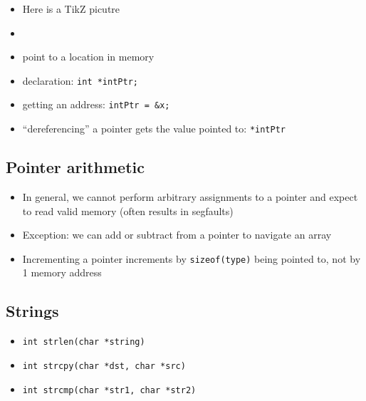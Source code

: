 \documentclass[
]{article}
\providecommand{\tightlist}{%
  \setlength{\itemsep}{0pt}\setlength{\parskip}{0pt}}
\begin{document}
\begin{itemize}
\tightlist
\item
  Here is a TikZ picutre
\end{itemize}


\begin{itemize}
\tightlist
\item
\item
  point to a location in memory
\item
  declaration: \texttt{int\ *intPtr;}
\item
  getting an address: \texttt{intPtr\ =\ \&x;}
\item
  ``dereferencing'' a pointer gets the value pointed to:
  \texttt{*intPtr}
\end{itemize}

\hypertarget{pointer-arithmetic}{%
\subsection{Pointer arithmetic}\label{pointer-arithmetic}}

\begin{itemize}
\tightlist
\item
  In general, we cannot perform arbitrary assignments to a pointer and
  expect to read valid memory (often results in segfaults)
\item
  Exception: we can add or subtract from a pointer to navigate an array
\item
  Incrementing a pointer increments by \texttt{sizeof(type)} being
  pointed to, not by 1 memory address
\end{itemize}

\hypertarget{strings}{%
\subsection{Strings}\label{strings}}

\begin{itemize}
\tightlist
\item
  \texttt{int\ strlen(char\ *string)}
\item
  \texttt{int\ strcpy(char\ *dst,\ char\ *src)}
\item
  \texttt{int\ strcmp(char\ *str1,\ char\ *str2)}
\end{itemize}
\end{document}
